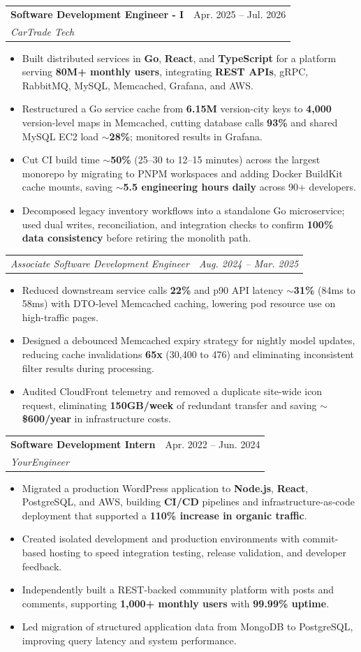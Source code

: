 \documentclass[letterpaper,11pt]{article}
\makeatletter
\newcommand{\resumeItem}[1]{
  \item\small{
    {#1 \vspace{-2pt}}
  }
}
\newcommand{\resumeSubheading}[4]{
  \vspace{-2pt}\item
    \begin{tabular*}{0.97\textwidth}[t]{l@{\extracolsep{\fill}}r}
      \textbf{#1} & #2 \\
      \textit{\small#3} & \textit{\small #4} \\
    \end{tabular*}\vspace{-7pt}
}
\newcommand{\resumeSubSubheading}[2]{
    \item
    \begin{tabular*}{0.97\textwidth}{l@{\extracolsep{\fill}}r}
      \textit{\small#1} & \textit{\small #2} \\
    \end{tabular*}\vspace{-7pt}
}
\newcommand{\resumeItemListStart}{\begin{itemize}}
\newcommand{\resumeItemListEnd}{\end{itemize}\vspace{-5pt}}
\makeatother
\begin{document}
\resumeSubheading
{Software Development Engineer - I}{Apr. 2025 -- Jul. 2026}
{CarTrade Tech}{ }
\resumeItemListStart
\resumeItem{Built distributed services in \textbf{Go}, \textbf{React}, and \textbf{TypeScript} for a platform serving \textbf{80M+ monthly users}, integrating \textbf{REST APIs}, gRPC, RabbitMQ, MySQL, Memcached, Grafana, and AWS.}
\resumeItem{Restructured a Go service cache from \textbf{6.15M} version-city keys to \textbf{4,000} version-level maps in Memcached, cutting database calls \textbf{93\%} and shared MySQL EC2 load \textbf{$\sim$28\%}; monitored results in Grafana.}
\resumeItem{Cut CI build time \textbf{$\sim$50\%} (25--30 to 12--15 minutes) across the largest monorepo by migrating to PNPM workspaces and adding Docker BuildKit cache mounts, saving \textbf{$\sim$5.5 engineering hours daily} across 90+ developers.}
\resumeItem{Decomposed legacy inventory workflows into a standalone Go microservice; used dual writes, reconciliation, and integration checks to confirm \textbf{100\% data consistency} before retiring the monolith path.}
\resumeItemListEnd
\resumeSubSubheading
{Associate Software Development Engineer}{Aug. 2024 -- Mar. 2025}
\resumeItemListStart
\resumeItem{Reduced downstream service calls \textbf{22\%} and p90 API latency \textbf{$\sim$31\%} (84ms to 58ms) with DTO-level Memcached caching, lowering pod resource use on high-traffic pages.}
\resumeItem{Designed a debounced Memcached expiry strategy for nightly model updates, reducing cache invalidations \textbf{65x} (30,400 to 476) and eliminating inconsistent filter results during processing.}
\resumeItem{Audited CloudFront telemetry and removed a duplicate site-wide icon request, eliminating \textbf{150GB/week} of redundant transfer and saving \textbf{$\sim$\$600/year} in infrastructure costs.}
\resumeItemListEnd

\resumeSubheading
{Software Development Intern}{Apr. 2022 -- Jun. 2024}
{YourEngineer}{ }
\resumeItemListStart
\resumeItem{Migrated a production WordPress application to \textbf{Node.js}, \textbf{React}, PostgreSQL, and AWS, building \textbf{CI/CD} pipelines and infrastructure-as-code deployment that supported a \textbf{110\% increase in organic traffic}.}
\resumeItem{Created isolated development and production environments with commit-based hosting to speed integration testing, release validation, and developer feedback.}
\resumeItem{Independently built a REST-backed community platform with posts and comments, supporting \textbf{1,000+ monthly users} with \textbf{99.99\% uptime}.}
\resumeItem{Led migration of structured application data from MongoDB to PostgreSQL, improving query latency and system performance.}
\resumeItemListEnd
\end{document}
